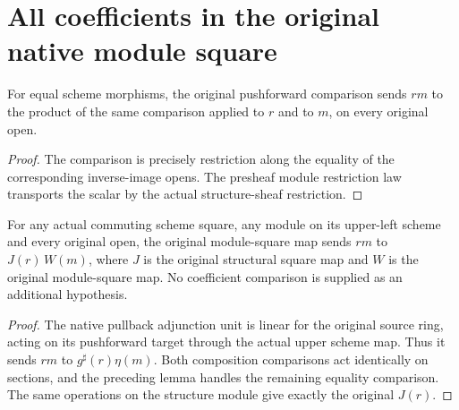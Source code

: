 \section{All coefficients in the original native module square}

\begin{lemma}
\label{lem:kn-native-pushforward-congr-scalars}
\leanok
For equal scheme morphisms, the original pushforward comparison sends
$r m$ to the product of the same comparison applied to $r$ and to $m$,
on every original open.
\end{lemma}
\begin{proof}
The comparison is precisely restriction along the equality of the
corresponding inverse-image opens. The presheaf module restriction law
transports the scalar by the actual structure-sheaf restriction.
\end{proof}

\begin{lemma}
\label{lem:kn-native-module-square-all-coefficients}
\leanok
For any actual commuting scheme square, any module on its upper-left
scheme and every original open, the original module-square map sends
$r m$ to $J(r)\,W(m)$, where $J$ is the original structural square map
and $W$ is the original module-square map. No coefficient comparison is
supplied as an additional hypothesis.
\end{lemma}
\begin{proof}
The native pullback adjunction unit is linear for the original source
ring, acting on its pushforward target through the actual upper scheme
map. Thus it sends $rm$ to $g^\sharp(r)\eta(m)$. Both composition
comparisons act identically on sections, and the preceding lemma
handles the remaining equality comparison. The same operations on the
structure module give exactly the original $J(r)$.
\end{proof}
